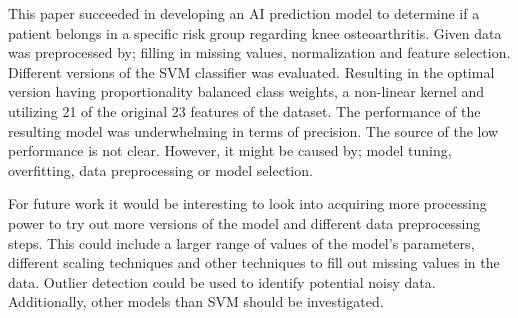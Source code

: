 This paper succeeded in developing an AI prediction model to determine if a patient belongs in a specific risk group regarding knee osteoarthritis. Given data was preprocessed by; filling in missing values, normalization and feature selection. Different versions of the SVM classifier was evaluated. Resulting in the optimal version having proportionality balanced class weights, a non-linear kernel and utilizing 21 of the original 23 features of the dataset. The performance of the resulting model was underwhelming in terms of precision. The source of the low performance is not clear. However, it might be caused by; model tuning, overfitting, data preprocessing or model selection. 

For future work it would be interesting to look into acquiring more processing power to try out more versions of the model and different data preprocessing steps. This could include a larger range of values of the model's parameters, different scaling techniques and other techniques to fill out missing values in the data. Outlier detection could be used to identify potential noisy data. Additionally, other models than SVM should be investigated.              
